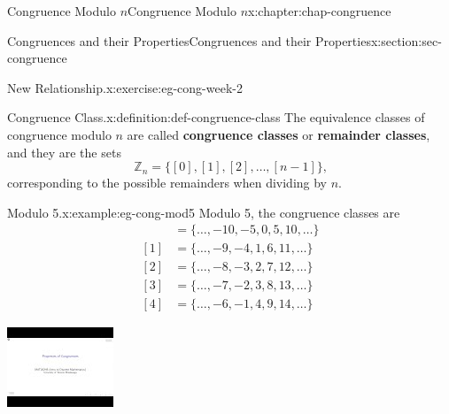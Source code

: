 \documentclass[oneside,10pt,]{book}
\newcommand{\terminology}[1]{\textbf{#1}}
\numberwithin{equation}{section}
\newlength{\qrsize}
\newlength{\previewwidth}
\newcommand{\amp}{&}
\begin{document}
\begin{chapterptx}{Congruence Modulo \(n\)}{}{Congruence Modulo \(n\)}{}{}{x:chapter:chap-congruence}
\begin{sectionptx}{Congruences and their Properties}{}{Congruences and their Properties}{}{}{x:section:sec-congruence}
\begin{inlineexercise}{New Relationship.}{x:exercise:eg-cong-week-2}
\end{inlineexercise}%
\begin{definition}{Congruence Class.}{x:definition:def-congruence-class}%
The equivalence classes of congruence modulo \(n\) are called \terminology{congruence classes} or \terminology{remainder classes}, and they are the sets%
\begin{equation*}
\mathbb{Z}_n = \{[0],[1],[2],\ldots,[n-1]\}\text{,}
\end{equation*}
corresponding to the possible remainders when dividing by \(n\). \label{g:notation:id537661}%
\end{definition}
\begin{example}{Modulo 5.}{x:example:eg-cong-mod5}%
Modulo 5, the congruence classes are%
\begin{align*}
[0] \amp = \{\ldots,-10,-5,0,5,10,\ldots\}\\
[1] \amp = \{\ldots,-9,-4,1,6,11,\ldots\}\\
[2] \amp = \{\ldots,-8,-3,2,7,12,\ldots\}\\
[3] \amp = \{\ldots,-7,-2,3,8,13,\ldots\}\\
[4] \amp = \{\ldots,-6,-1,4,9,14,\ldots\}
\end{align*}
%
\end{example}
\begin{sidebyside}{1}{0}{0}{0}%
\begin{sbspanel}{1}%
\setlength{\qrsize}{9em}
\setlength{\previewwidth}{\linewidth}
\addtolength{\previewwidth}{-\qrsize}
\begin{tcbraster}[raster columns=2, raster column skip=1pt, raster halign=center, raster force size=false, raster left skip=0pt, raster right skip=0pt]%
\begin{tcolorbox}[previewstyle, width=\previewwidth]%
\includegraphics[width=0.80\linewidth,height=\qrsize,keepaspectratio]{images/video-properties-of-congruence.jpg}%

\end{tcolorbox}
\end{tcbraster}
\end{sbspanel}
\end{sidebyside}
\end{sectionptx}
\end{chapterptx}
\end{document}
